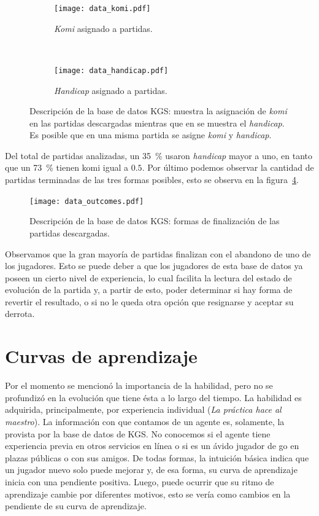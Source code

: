 \documentclass[11pt,twoside, spanish]{report} %
\begin{document}
\begin{figure}[H]
	\centering
	\begin{subfigure}[t]{.49\textwidth}
		\centering
		\texttt{[image: data\_komi.pdf]}
		\caption{\emph{Komi} asignado a partidas.}
		\label{fig:komi}
	\end{subfigure}
	~
	\begin{subfigure}[t]{.49\textwidth}
		\centering
		\texttt{[image: data\_handicap.pdf]}
		\caption{\emph{Handicap} asignado a partidas.}
		\label{fig:handicap}
	\end{subfigure}
	\caption{Descripci\'on de la base de datos KGS: muestra la asignaci\'on de \emph{komi} en las partidas descargadas mientras que en  se muestra el \emph{handicap}. Es posible que en una misma partida se asigne \emph{komi} y \emph{handicap}.}
	\label{fig:komiHandicap}
\end{figure}


Del total de partidas analizadas, un \SI{35}{\percent} usaron \textit{handicap} mayor a uno, en tanto que un \SI{73}{\percent}  tienen komi igual a $0.5$.
Por \'ultimo podemos observar la cantidad de partidas terminadas de las tres formas posibles, esto se observa en la figura~\ref{fig:Outcomes}.

\begin{figure}[H]
	\centering
	\texttt{[image: data\_outcomes.pdf]}
	\caption{Descripci\'on de la base de datos KGS: formas de finalizaci\'on de las partidas descargadas.}
	\label{fig:Outcomes}
\end{figure}

Observamos que la gran mayor\'ia de partidas finalizan con el abandono de uno de los jugadores.
Esto se puede deber a que los jugadores de esta base de datos ya poseen un cierto nivel de experiencia, lo cual facilita la lectura del estado de evoluci\'on de la partida y, a partir de esto, poder determinar si hay forma de revertir el resultado, o si no le queda otra opci\'on que resignarse y aceptar su derrota.

\section{Curvas de aprendizaje}

Por el momento se mencion\'o la importancia de la habilidad, pero no se profundiz\'o en la evoluci\'on que tiene \'esta a lo largo del tiempo.
La habilidad es adquirida, principalmente, por experiencia individual (\textsl{La pr\'actica hace al maestro}).
La informaci\'on con que contamos de un agente es, solamente, la provista por la base de datos de KGS.
No conocemos si el agente tiene experiencia previa en otros servicios en l\'inea o si es un \'avido jugador de go en plazas p\'ublicas o con sus amigos.
De todas formas, la intuici\'on b\'asica indica que un jugador nuevo solo puede mejorar y, de esa forma, su curva de aprendizaje inicia con una pendiente positiva.
Luego, puede ocurrir que su ritmo de aprendizaje cambie por diferentes motivos, esto se ver\'ia como cambios en la pendiente de su curva de aprendizaje.
\end{document}
